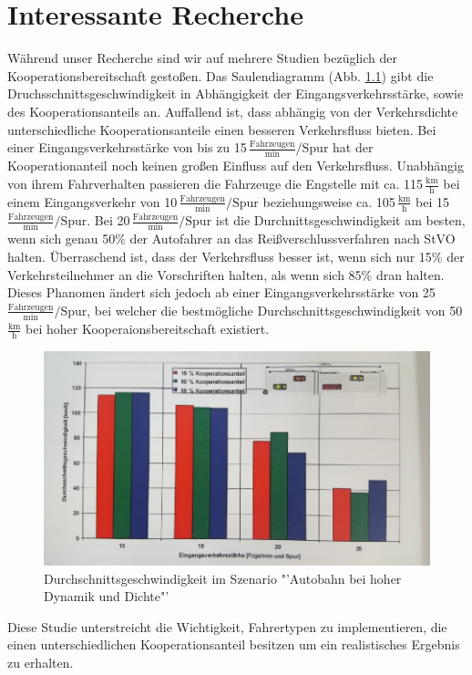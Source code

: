 \chapter{Interessante Recherche}
Während unser Recherche sind wir auf mehrere Studien bezüglich der Kooperationsbereitschaft gestoßen. Das Saulendiagramm (Abb. \ref{fig:kooperation}) gibt die Druchsschnittsgeschwindigkeit in Abhängigkeit der Eingangsverkehrsstärke, sowie des Kooperationsanteils an. Auffallend ist, dass abhängig von der Verkehrsdichte unterschiedliche Kooperationsanteile einen besseren Verkehrsfluss bieten. Bei einer Eingangsverkehrsstärke von bis zu 15\,$\frac{\text{Fahrzeugen}}{\text{min}}/\text{Spur}$ hat der Kooperationanteil noch keinen großen Einfluss auf den Verkehrsfluss. Unabhängig von ihrem Fahrverhalten passieren die Fahrzeuge die Engstelle mit ca. 115\,$\frac{\text{km}}{\text{h}}$ bei einem Eingangsverkehr von 10\,$\frac{\text{Fahrzeugen}}{\text{min}}/\text{Spur}$ beziehungsweise ca. 105\,$\frac{\text{km}}{\text{h}}$ bei 15\,$\frac{\text{Fahrzeugen}}{\text{min}}/\text{Spur}$.
Bei 20\,$\frac{\text{Fahrzeugen}}{\text{min}}/\text{Spur}$ ist die Durchnittsgeschwindigkeit am besten, wenn sich genau 50\% der Autofahrer an das Reißverschlussverfahren nach StVO halten. Überraschend ist, dass der Verkehrsfluss besser ist, wenn sich nur 15\% der Verkehrsteilnehmer an die Vorschriften halten, als wenn sich 85\% dran halten. Dieses Phanomen ändert sich jedoch ab einer Eingangsverkehrsstärke von 25\,$\frac{\text{Fahrzeugen}}{\text{min}}/\text{Spur}$, bei welcher die bestmögliche Durchschnittsgeschwindigkeit von 50\,$\frac{\text{km}}{\text{h}}$ bei hoher Kooperaionsbereitschaft existiert.\\
\begin{figure}
	\centering
	\includegraphics[width=0.6\linewidth]{images/Kooperation}
	\caption{Durchschnittsgeschwindigkeit im Szenario "'Autobahn bei hoher Dynamik und Dichte"'}
	\label{fig:kooperation}
\end{figure}
Diese Studie unterstreicht die Wichtigkeit, Fahrertypen zu implementieren, die einen unterschiedlichen Kooperationsanteil besitzen um ein realistisches Ergebnis zu erhalten.